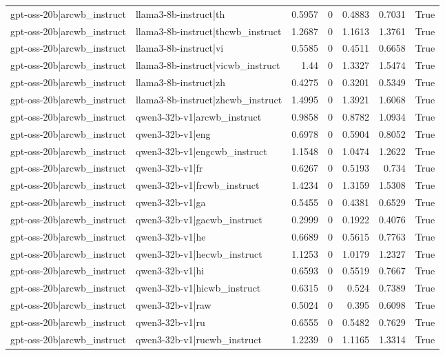\begin{table}
\begin{tabular}{l l r r r r l}
gpt-oss-20b|arcwb_instruct & llama3-8b-instruct|th & 0.5957 & 0 & 0.4883 & 0.7031 & True \\
gpt-oss-20b|arcwb_instruct & llama3-8b-instruct|thcwb_instruct & 1.2687 & 0 & 1.1613 & 1.3761 & True \\
gpt-oss-20b|arcwb_instruct & llama3-8b-instruct|vi & 0.5585 & 0 & 0.4511 & 0.6658 & True \\
gpt-oss-20b|arcwb_instruct & llama3-8b-instruct|vicwb_instruct & 1.44 & 0 & 1.3327 & 1.5474 & True \\
gpt-oss-20b|arcwb_instruct & llama3-8b-instruct|zh & 0.4275 & 0 & 0.3201 & 0.5349 & True \\
gpt-oss-20b|arcwb_instruct & llama3-8b-instruct|zhcwb_instruct & 1.4995 & 0 & 1.3921 & 1.6068 & True \\
gpt-oss-20b|arcwb_instruct & qwen3-32b-v1|arcwb_instruct & 0.9858 & 0 & 0.8782 & 1.0934 & True \\
gpt-oss-20b|arcwb_instruct & qwen3-32b-v1|eng & 0.6978 & 0 & 0.5904 & 0.8052 & True \\
gpt-oss-20b|arcwb_instruct & qwen3-32b-v1|engcwb_instruct & 1.1548 & 0 & 1.0474 & 1.2622 & True \\
gpt-oss-20b|arcwb_instruct & qwen3-32b-v1|fr & 0.6267 & 0 & 0.5193 & 0.734 & True \\
gpt-oss-20b|arcwb_instruct & qwen3-32b-v1|frcwb_instruct & 1.4234 & 0 & 1.3159 & 1.5308 & True \\
gpt-oss-20b|arcwb_instruct & qwen3-32b-v1|ga & 0.5455 & 0 & 0.4381 & 0.6529 & True \\
gpt-oss-20b|arcwb_instruct & qwen3-32b-v1|gacwb_instruct & 0.2999 & 0 & 0.1922 & 0.4076 & True \\
gpt-oss-20b|arcwb_instruct & qwen3-32b-v1|he & 0.6689 & 0 & 0.5615 & 0.7763 & True \\
gpt-oss-20b|arcwb_instruct & qwen3-32b-v1|hecwb_instruct & 1.1253 & 0 & 1.0179 & 1.2327 & True \\
gpt-oss-20b|arcwb_instruct & qwen3-32b-v1|hi & 0.6593 & 0 & 0.5519 & 0.7667 & True \\
gpt-oss-20b|arcwb_instruct & qwen3-32b-v1|hicwb_instruct & 0.6315 & 0 & 0.524 & 0.7389 & True \\
gpt-oss-20b|arcwb_instruct & qwen3-32b-v1|raw & 0.5024 & 0 & 0.395 & 0.6098 & True \\
gpt-oss-20b|arcwb_instruct & qwen3-32b-v1|ru & 0.6555 & 0 & 0.5482 & 0.7629 & True \\
gpt-oss-20b|arcwb_instruct & qwen3-32b-v1|rucwb_instruct & 1.2239 & 0 & 1.1165 & 1.3314 & True \\

\end{tabular}
\end{table}
